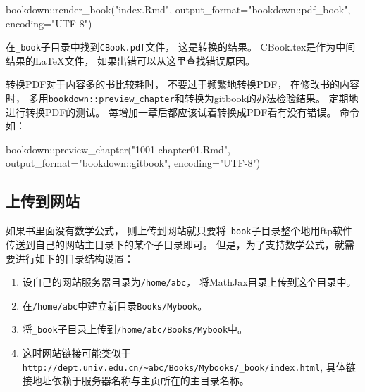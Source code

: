 \documentclass[
]{book}
\newenvironment{Shaded}{\begin{snugshade}}{\end{snugshade}}
\newcommand{\AttributeTok}[1]{\textcolor[rgb]{0.77,0.63,0.00}{#1}}
\newcommand{\FunctionTok}[1]{\textcolor[rgb]{0.00,0.00,0.00}{#1}}
\newcommand{\NormalTok}[1]{#1}
\newcommand{\SpecialCharTok}[1]{\textcolor[rgb]{0.00,0.00,0.00}{#1}}
\newcommand{\StringTok}[1]{\textcolor[rgb]{0.31,0.60,0.02}{#1}}
\providecommand{\tightlist}{%
  \setlength{\itemsep}{0pt}\setlength{\parskip}{0pt}}
\begin{document}
\begin{Shaded}
\begin{Highlighting}[]
\NormalTok{bookdown}\SpecialCharTok{::}\FunctionTok{render\_book}\NormalTok{(}\StringTok{"index.Rmd"}\NormalTok{, }
  \AttributeTok{output\_format=}\StringTok{"bookdown::pdf\_book"}\NormalTok{, }\AttributeTok{encoding=}\StringTok{"UTF{-}8"}\NormalTok{)}
\end{Highlighting}
\end{Shaded}

在\texttt{\_book}子目录中找到\texttt{CBook.pdf}文件，
这是转换的结果。
CBook.tex是作为中间结果的LaTeX文件，
如果出错可以从这里查找错误原因。

转换PDF对于内容多的书比较耗时，
不要过于频繁地转换PDF，
在修改书的内容时，
多用\texttt{bookdown::preview\_chapter}和转换为gitbook的办法检验结果。
定期地进行转换PDF的测试。
每增加一章后都应该试着转换成PDF看有没有错误。
命令如：

\begin{Shaded}
\begin{Highlighting}[]
\NormalTok{bookdown}\SpecialCharTok{::}\FunctionTok{preview\_chapter}\NormalTok{(}\StringTok{"1001{-}chapter01.Rmd"}\NormalTok{, }
  \AttributeTok{output\_format=}\StringTok{"bookdown::gitbook"}\NormalTok{, }\AttributeTok{encoding=}\StringTok{"UTF{-}8"}\NormalTok{)}
\end{Highlighting}
\end{Shaded}

\hypertarget{usage-website}{%
\subsection{上传到网站}\label{usage-website}}

如果书里面没有数学公式，
则上传到网站就只要将\texttt{\_book}子目录整个地用ftp软件传送到自己的网站主目录下的某个子目录即可。
但是，为了支持数学公式，就需要进行如下的目录结构设置：

\begin{enumerate}
\def\labelenumi{\arabic{enumi}.}
\tightlist
\item
  设自己的网站服务器目录为\texttt{/home/abc}，
  将MathJax目录上传到这个目录中。
\item
  在\texttt{/home/abc}中建立新目录\texttt{Books/Mybook}。
\item
  将\texttt{\_book}子目录上传到\texttt{/home/abc/Books/Mybook}中。
\item
  这时网站链接可能类似于\texttt{http://dept.univ.edu.cn/\textasciitilde{}abc/Books/Mybooks/\_book/index.html},
  具体链接地址依赖于服务器名称与主页所在的主目录名称。
\end{enumerate}
\end{document}
